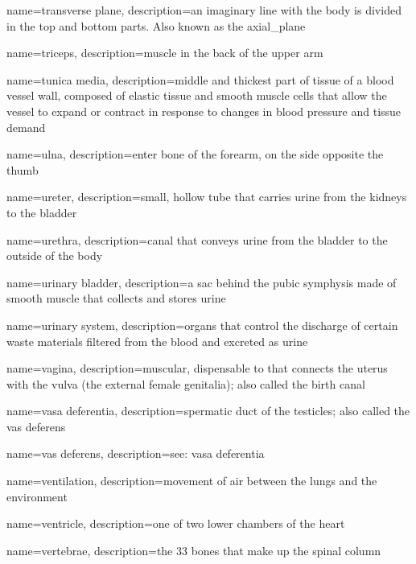 \documentclass[../../EMT-169.tex]{subfiles}
\begin{document}
	{
		name=transverse plane,
		description={an imaginary line with the body is divided in the top and bottom parts.  Also known as the \gls{axial_plane}}
	}
	
	{
		name=triceps,
		description={muscle in the back of the upper arm}
	}
	
	{
		name=tunica media,
		description={middle and thickest part of tissue of a blood vessel wall, composed of elastic tissue and smooth muscle cells that allow the vessel to expand or contract in response to changes in blood pressure and tissue demand}
	}
	
	{
		name=ulna,
		description={enter bone of the forearm, on the side opposite the thumb}
	}
	
	{
		name=ureter,
		description={small, hollow tube that carries urine from the kidneys to the bladder}
	}
	
	{
		name=urethra,
		description={canal that conveys urine from the bladder to the outside of the body}
	}
	
	{
		name=urinary bladder,
		description={a sac behind the pubic symphysis made of smooth muscle that collects and stores urine}
	}
	
	{
		name=urinary system,
		description={organs that control the discharge of certain waste materials filtered from the blood and excreted as urine}
	}
	
	{
		name=vagina,
		description={muscular, dispensable to that connects the uterus with the vulva (the external female genitalia); also called the birth canal}
	}
	
	{
		name=vasa deferentia,
		description={spermatic duct of the testicles; also called the vas deferens}
	}
	
	{
		name=vas deferens,
		description={see: vasa deferentia}
	}
	
	{
		name=ventilation,
		description={movement of air between the lungs and the environment}
	}
	
	{
		name=ventricle,
		description={one of two lower chambers of the heart}
	}
	
	{
		name=vertebrae,
		description={the 33 bones that make up the spinal column}
	}
	
\end{document}
